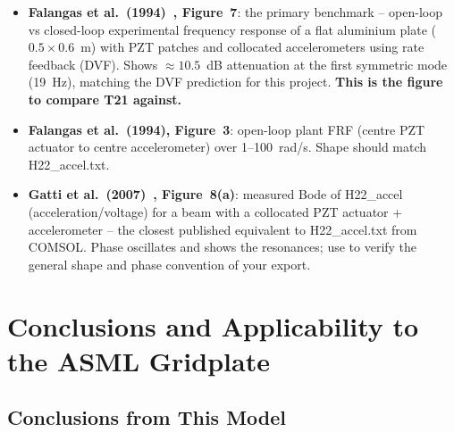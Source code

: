 \documentclass[12pt,a4paper]{article}
\begin{document}
\begin{itemize}
  \item \textbf{Falangas et al.\ (1994)~\cite{falangas1994}, Figure~7}: the primary
        benchmark -- open-loop vs closed-loop experimental frequency response of a flat
        aluminium plate ($0.5 \times 0.6$~m) with PZT patches and collocated
        accelerometers using rate feedback (DVF).  Shows $\approx 10.5$~dB attenuation at
        the first symmetric mode (19~Hz), matching the DVF prediction for this project.
        \textbf{This is the figure to compare T21 against.}
  \item \textbf{Falangas et al.\ (1994), Figure~3}: open-loop plant FRF (centre PZT
        actuator to centre accelerometer) over 1--100~rad/s.  Shape should match H22\_accel.txt.
  \item \textbf{Gatti et al.\ (2007)~\cite{gatti2007}, Figure~8(a)}: measured Bode of
        H22\_accel (acceleration/voltage) for a beam with a collocated PZT actuator +
        accelerometer -- the closest published equivalent to H22\_accel.txt from COMSOL.
        Phase oscillates and shows the resonances; use to verify the general shape and
        phase convention of your export.
\end{itemize}

\section{Conclusions and Applicability to the ASML Gridplate}
\label{sec:conclusions}

\subsection{Conclusions from This Model}
\end{document}

